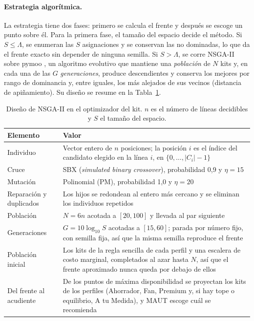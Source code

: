 \paragraph{Estrategia algorítmica.} La estrategia tiene dos fases: primero se calcula el frente y
después se escoge un punto sobre él. Para la primera fase, el tamaño del espacio decide el método.
Si $S\leq\Lambda$, se enumeran las $S$ asignaciones y se conservan las no dominadas, lo que da el
frente exacto sin depender de ninguna semilla. Si $S>\Lambda$, se corre NSGA-II
\citep{deb_fast_2002} sobre pymoo \citep{blank_pymoo_2020}, un algoritmo evolutivo que mantiene una
\emph{población} de $N$ kits y, en cada una de las $G$ \emph{generaciones}, produce descendientes y conserva
los mejores por rango de dominancia y, entre iguales, los más alejados de sus vecinos (distancia de
apiñamiento). Su diseño se resume en la Tabla~\ref{tab:nsga-diseno}.

\begin{table}[!htb]
\centering\footnotesize
\caption{Diseño de NSGA-II en el optimizador del kit. $n$ es el número de líneas decidibles y $S$ el tamaño del espacio.}
\label{tab:nsga-diseno}
\begin{tabularx}{\textwidth}{@{}p{3.6cm}X@{}}
\toprule
Elemento & Valor \\
\midrule
Individuo & Vector entero de $n$ posiciones; la posición $i$ es el índice del candidato elegido en la línea $i$, en $\{0,\dots,|C_i|-1\}$ \\
Cruce & SBX (\emph{simulated binary crossover}), probabilidad 0,9 y $\eta=15$ \\
Mutación & Polinomial (PM), probabilidad 1,0 y $\eta=20$ \\
Reparación y duplicados & Los hijos se redondean al entero más cercano y se eliminan los individuos repetidos \\
Población & $N=6n$ acotada a $[20,100]$ y llevada al par siguiente \\
Generaciones & $G=10\log_{10}S$ acotadas a $[15,60]$; parada por número fijo, con semilla fija, así que la misma semilla reproduce el frente \\
Población inicial & Los kits de la regla sencilla de cada perfil y una escalera de costo marginal, completados al azar hasta $N$, así que el frente aproximado nunca queda por debajo de ellos \\
Del frente al acudiente & De los puntos de máxima disponibilidad se proyectan los kits de los perfiles (Ahorrador, Fan, Premium y, si hay tope o equilibrio, A tu Medida), y MAUT escoge cuál se recomienda \\
\bottomrule
\end{tabularx}
\end{table}

